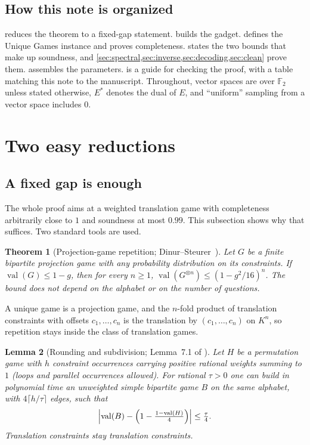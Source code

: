 \documentclass[11pt]{article}
\newtheorem{theorem}{Theorem}[section]
\newtheorem{lemma}[theorem]{Lemma}
\theoremstyle{definition}
\theoremstyle{remark}
\newcommand{\F}{\mathbb F}
\DeclareMathOperator{\val}{val}
\begin{document}
\subsection{How this note is organized}

 reduces the theorem to a fixed-gap statement.
 builds the gadget.  defines the Unique
Games instance and proves completeness.  states the two bounds
that make up soundness, and
\cref{sec:spectral,sec:inverse,sec:decoding,sec:clean} prove them.
 assembles the parameters.  is a guide for
checking the proof, with a table matching this note to the manuscript.
Throughout, vector spaces are over $\F_2$ unless stated otherwise, $E^*$
denotes the dual of $E$, and ``uniform'' sampling from a vector space
includes $0$.

\section{Two easy reductions}\label{sec:reductions}

\subsection{A fixed gap is enough}\label{sec:amplify}

The whole proof aims at a weighted translation game with completeness
arbitrarily close to $1$ and soundness at most $0.99$. This subsection shows
why that suffices. Two standard tools are used.

\begin{theorem}[Projection-game repetition; Dinur--Steurer~{\cite[Cor.~1.2]{DS14}}]\label{thm:repetition}
Let $G$ be a finite bipartite projection game with any probability
distribution on its constraints. If $\val(G)\le1-g$, then for every $n\ge1$,
$\val(G^{\otimes n})\le(1-g^2/16)^n$. The bound does not depend on the
alphabet or on the number of questions.
\end{theorem}

A unique game is a projection game, and the $n$-fold product of translation
constraints with offsets $c_1,\dots,c_n$ is the translation by
$(c_1,\dots,c_n)$ on $K^n$, so repetition stays inside the class of
translation games.

\begin{lemma}[Rounding and subdivision; Lemma~7.1 of \cite{OpenAI-UGC}]\label{lem:subdivide}
Let $H$ be a permutation game with $h$ constraint occurrences carrying positive
rational weights summing to $1$ (loops and parallel occurrences allowed). For
rational $\tau>0$ one can build in polynomial time an unweighted simple
bipartite game $B$ on the same alphabet, with $4\lceil h/\tau\rceil$ edges, such
that
\[
\Bigl|\val(B)-\Bigl(1-\tfrac{1-\val(H)}{4}\Bigr)\Bigr|\le\tfrac\tau4 .
\]
Translation constraints stay translation constraints.
\end{lemma}
\end{document}
